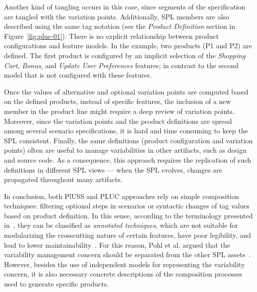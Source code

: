 \documentclass{acm_proc_article-sp}
\begin{document}
Another kind of tangling occurs in this case, since segments of the
specification are tangled with the variation points. Additionally, SPL members
are also described using the same tag notation (see the \emph{Product Definition}
section in Figure~\ref{fig:pluc-01}). There is no explicit relationship between
product configurations and feature models. In the example, two products (P1 and
P2) are defined. The first product is configured by an implicit selection of
the \emph{Shopping Cart}, \emph{Bonus}, and \emph{Update User Preferences}
features; in contrast to the second model that is not configured with these
features.

Once the values of alternative and optional variation points are computed based
on the defined products, instead of specific features, the inclusion of a new
member in the product line might require a deep review of variation points.
Moreover, since the variation points and the product definitions are spread among
several scenario specifications, it is hard and time consuming to keep the SPL
consistent. Finally, the same definitions (product configuration and variation
points) often are useful to manage variabilities in other artifacts, such as
design and source code. As a consequence, this approach requires the replication
of such definitions in different SPL views --- when the SPL evolves, changes are
propagated throughout many artifacts. 

In conclusion, both PlUSS and PLUC approaches rely on simple composition
techniques: filtering optional steps in scenarios or syntactic changes of tag
values based on product definition. In this sense, according to the terminology
presented in~\cite{}, they can be classified as \emph{annotated techniques},
which are not suitable for modularizing the crosscutting nature of certain
features, have poor legibility, and lead to lower
maintainability~\cite{alves-gpce-06}. For this reason, Pohl et al.
argued that the variability management concern should be separated from the other
SPL assets~\cite{phol-spl-book}. However, besides the use of independent models
for representing the variability concern, it is also necessary concrete
descriptions of the composition processes used to generate specific products.

% 
\end{document}
